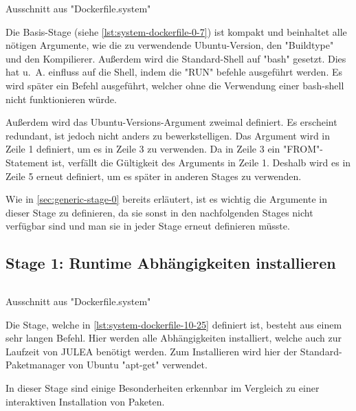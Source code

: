 \begin{listing}[H]
    \inputminted[firstline=0,lastline=7]{dockerfile}{./code-examples/Dockerfile.system}
    \caption{Ausschnitt aus "Dockerfile.system"}
    \label{lst:system-dockerfile-0-7}
\end{listing}


Die Basis-Stage (siehe \cref{lst:system-dockerfile-0-7}) ist kompakt und beinhaltet alle nötigen Argumente, wie die zu verwendende Ubuntu-Version, den "Buildtype" und den Kompilierer. Außerdem wird die Standard-Shell auf "bash" gesetzt. Dies hat u. A. einfluss auf die Shell, indem die "RUN" befehle ausgeführt werden. Es wird später ein Befehl ausgeführt, welcher ohne die Verwendung einer bash-shell nicht funktionieren würde.

Außerdem wird das Ubuntu-Versions-Argument zweimal definiert. Es erscheint redundant, ist jedoch nicht anders zu bewerkstelligen. Das Argument wird in Zeile 1 definiert, um es in Zeile 3 zu verwenden. Da in Zeile 3 ein "FROM"-Statement ist, verfällt die Gültigkeit des Arguments in Zeile 1. Deshalb wird es in Zeile 5 erneut definiert, um es später in anderen Stages zu verwenden. 

Wie in \cref{sec:generic-stage-0} bereits erläutert, ist es wichtig die Argumente in dieser Stage zu definieren, da sie sonst in den nachfolgenden Stages nicht verfügbar sind und man sie in jeder Stage erneut definieren müsste.

\subsection{Stage 1: Runtime Abhängigkeiten installieren} \label{sec:system-stage-1}

\begin{listing}[H]
    \inputminted[firstline=10,lastline=25]{dockerfile}{./code-examples/Dockerfile.system}
    \caption{Ausschnitt aus "Dockerfile.system"}
    \label{lst:system-dockerfile-10-25}
\end{listing}

Die Stage, welche in \cref{lst:system-dockerfile-10-25} definiert ist, besteht aus einem sehr langen Befehl. Hier werden alle Abhängigkeiten installiert, welche auch zur Laufzeit von JULEA benötigt werden. Zum Installieren wird hier der Standard-Paketmanager von Ubuntu "apt-get" verwendet. 

In dieser Stage sind einige Besonderheiten erkennbar im Vergleich zu einer interaktiven Installation von Paketen. 

